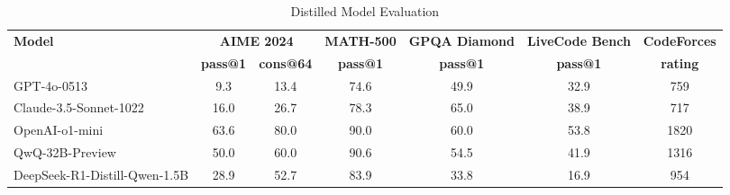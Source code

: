 \documentclass{article}
\begin{document}


    \begin{table}[htb]
    \centering
    \caption{Distilled Model Evaluation}
    \label{tab:distilled-model-evaluation}
    \begin{tabular}{l c c c c c c}
    \toprule
    \textbf{Model} & \multicolumn{2}{c}{\textbf{AIME 2024}} & \textbf{MATH-500} & \textbf{GPQA Diamond} & \textbf{LiveCode Bench} & \textbf{CodeForces} \\
    \cmidrule(r){2-3}
    & \textbf{pass@1} & \textbf{cons@64} & \textbf{pass@1} & \textbf{pass@1} & \textbf{pass@1} & \textbf{rating} \\
    \midrule
    GPT-4o-0513 & 9.3 & 13.4 & 74.6 & 49.9 & 32.9 & 759 \\
    Claude-3.5-Sonnet-1022 & 16.0 & 26.7 & 78.3 & 65.0 & 38.9 & 717 \\
    OpenAI-o1-mini & 63.6 & 80.0 & 90.0 & 60.0 & 53.8 & 1820 \\
    QwQ-32B-Preview & 50.0 & 60.0 & 90.6 & 54.5 & 41.9 & 1316 \\
    DeepSeek-R1-Distill-Qwen-1.5B & 28.9 & 52.7 & 83.9 & 33.8 & 16.9 & 954 \\
    \bottomrule
    \end{tabular}
    \end{table}
\end{document}
